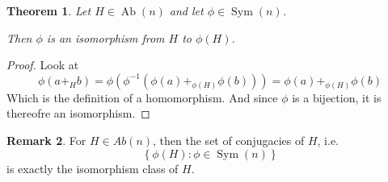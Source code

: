 \documentclass[a4paper, 12pt, english]{article}
\theoremstyle{plain}
\newtheorem{theorem}{Theorem}[section]
\theoremstyle{definition}
\newtheorem{remark}[theorem]{Remark}
\newcommand{\set}[1]{ \left\{ #1 \right\} } %
\DeclareMathOperator{\Ab}{Ab}
\DeclareMathOperator{\Sym}{Sym}
\begin{document}
\begin{theorem} \label{thm:conjugacy-isomorphism}
    Let \( H \in \Ab(n) \) and let \( \phi \in \Sym(n) \).

    Then \( \phi \) is an isomorphism from \( H \) to \( \phi(H) \).
\end{theorem}
\begin{proof}
    Look at
    \[
        \phi(a +_H b) = \phi(\phi^{-1}(\phi(a) +_{\phi(H)} \phi(b))) = \phi(a) +_{\phi(H)} \phi(b)
    \]
    Which is the definition of a homomorphism. And since \( \phi \) is a bijection, it is thereofre an isomorphism.
\end{proof}

\begin{remark}
    For \( H \in Ab(n) \), then the set of conjugacies of \( H \), i.e. 
    \[
        \set{\phi(H) : \phi \in \Sym(n)}
    \]
    is exactly the isomorphism class of \( H \).
\end{remark}
\end{document}
